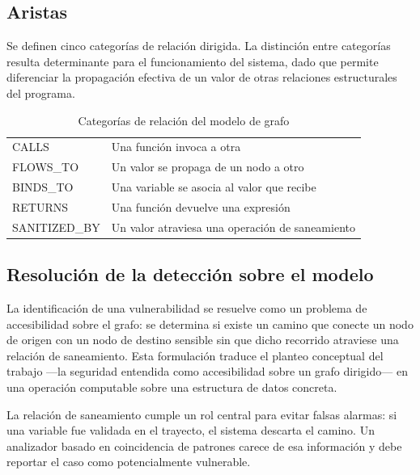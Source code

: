 \subsection{Aristas}\label{sec:n4.5.2}

Se definen cinco categorías de relación dirigida. La distinción entre categorías resulta determinante para el funcionamiento del sistema, dado que permite diferenciar la propagación efectiva de un valor de otras relaciones estructurales del programa.

\begin{table}[H]
    \centering
    \caption{Categorías de relación del modelo de grafo}
    \label{tab:aristas}
    \small
    \begin{tabularx}{\textwidth}{l L}
        \toprule
         &  \\
        \midrule
        CALLS & Una función invoca a otra \\
        FLOWS\_TO & Un valor se propaga de un nodo a otro \\
        BINDS\_TO & Una variable se asocia al valor que recibe \\
        RETURNS & Una función devuelve una expresión \\
        SANITIZED\_BY & Un valor atraviesa una operación de saneamiento \\
        \bottomrule
    \end{tabularx}
\end{table}

\subsection{Resolución de la detección sobre el modelo}\label{sec:n4.5.3}

La identificación de una vulnerabilidad se resuelve como un problema de accesibilidad sobre el grafo: se determina si existe un camino que conecte un nodo de origen con un nodo de destino sensible sin que dicho recorrido atraviese una relación de saneamiento. Esta formulación traduce el planteo conceptual del trabajo —la seguridad entendida como accesibilidad sobre un grafo dirigido— en una operación computable sobre una estructura de datos concreta.

La relación de saneamiento cumple un rol central para evitar falsas alarmas: si una variable fue validada en el trayecto, el sistema descarta el camino. Un analizador basado en coincidencia de patrones carece de esa información y debe reportar el caso como potencialmente vulnerable.

